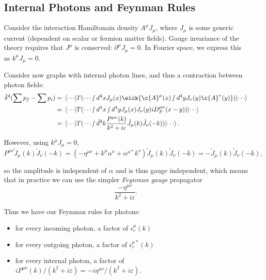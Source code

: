 \documentclass{article}
\numberwithin{equation}{section}
\begin{document}
\subsection{Internal Photons and Feynman Rules}

Consider the interaction Hamiltonain density $A^\mu J_\mu$, where $J_\mu$ is some generic current (dependent on scalar or fermion matter fields). Gauge invariance of the theory requires that $J^\mu$ is conserved: $\partial^\mu J_\mu = 0$. In Fourier space, we express this as $k^\mu J_\mu = 0$. 

Consider now graphs with internal photon lines, and thus a contraction between photon fields:
\begin{equation}
\begin{aligned}
    \hat{\delta}^4(\sum p_f - \sum p_i) &= \ev{T(\cdots \smallint d^4x J_\mu(x)\wick{\c{A}^\mu(x) \smallint d^4y J_\nu(y) \c{A}^\nu(y)})}{\cdots} \\
    &= \ev{T(\cdots \smallint d^4x \smallint d^4y J_\mu(x) J_\nu(y) iD_F^{\mu\nu}(x-y))}{\cdots} \\
    &= \ev{T(\cdots \smallint \hat{d}^4k \frac{P^{\mu\nu}(k)}{k^2+i \varepsilon} \tilde{J}_\mu(k) \tilde{J}_\nu(-k))}{\cdots}.
\end{aligned}
\end{equation}

However, using $k^\mu J_\mu = 0$,
\begin{equation}
    P^{\mu\nu} \tilde{J}_\mu(k) \tilde{J}_\nu(-k) = (-\eta^{\mu\nu} + k^\mu \alpha^\nu + \alpha^{\mu*}k^\nu) \tilde{J}_\mu(k) \tilde{J}_\nu(-k) = -\tilde{J}_\mu(k) \tilde{J}_\nu(-k),
\end{equation}

so the amplitude is independent of $\alpha$ and is thus gauge independent, which means that in practice we can use the simpler \textit{Feynman gauge} propagator
\begin{equation}
    \frac{-\eta^{\mu\nu}}{k^2 + i\varepsilon}.
\end{equation}

Thus we have our Feynman rules for photons:
\begin{itemize}
    \item for every incoming photon, a factor of $\epsilon_r^\mu(k)$
    \item for every outgoing photon, a factor of $\epsilon_r^{\mu*}(k)$
    \item for every internal photon, a factor of $iP^{\mu\nu}(k)/(k^2+i\varepsilon) = -i\eta^{\mu\nu}/(k^2+i\varepsilon)$.
\end{itemize}
\end{document}
